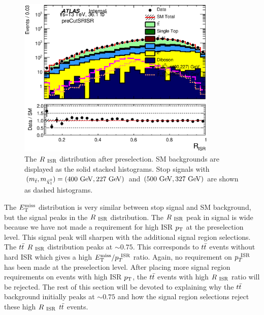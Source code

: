 \begin{figure}[h!]
  \centering
	\includegraphics[width=0.85\textwidth]{figures/plotRegion/CA_RISR_preCutSRISR_log.eps}
\caption[The $\RISR = \met/\PTISR$ distribution after zero-lepton preselection for stop signal and SM background]{ The $R_{~\mathrm{ISR}}$ distribution after preselection.  SM backgrounds are displayed as the solid stacked histograms.  Stop signals with $(m_{\stop}, m_{\ninoone}) = (400 \gev,227 \gev)$ and $(500 \gev, 327 \gev)$ are shown as dashed histograms. } %
\label{fig:presel_dist_2} 
\end{figure}

\indent  The $E_{\mathrm{T}}^{\mathrm{miss}}$ distribution is very similar between stop signal and SM background, but the signal peaks in the $R_{~\mathrm{ISR}}$ distribution.  The $R_{~\mathrm{ISR}}$ peak in signal is wide because we have not made a requirement for high ISR $p_{\mathrm{T}}$ at the preselection level.  This signal peak will sharpen with the additional signal region selections.  \\

\indent The $t\bar{t}$ $R_{~\mathrm{ISR}}$ distribution peaks at $\sim0.75$.  This corresponds to $t\bar{t}$ events without hard ISR which gives a high $E_{\mathrm{T}}^{\mathrm{miss}}/p_{T}^{~\mathrm{ISR}}$ ratio.  Again, no requirement on $p_{T}^{~\mathrm{ISR}}$ has been made at the preselection level.  After placing more signal region requirements on events with high ISR $p_{\mathrm{T}}$,  the $t\bar{t}$ events with high $R_{~\mathrm{ISR}}$ ratio will be rejected.  The rest of this section will be devoted to explaining why the $t\bar{t}$ background initially peaks at $\sim0.75$ and how the signal region selections reject these high $R_{~\mathrm{ISR}}$ $t\bar{t}$ events.  \\

